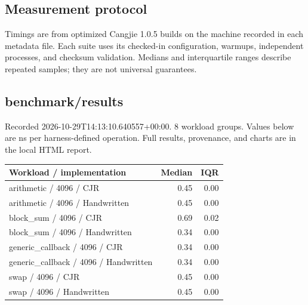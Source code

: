 \subsection{Measurement protocol}
Timings are from optimized Cangjie 1.0.5 builds on the machine recorded in each metadata file. Each suite uses its checked-in configuration, warmups, independent processes, and checksum validation. Medians and interquartile ranges describe repeated samples; they are not universal guarantees.\par
\subsection{benchmark/results}
Recorded 2026-10-29T14:13:10.640557+00:00. 8 workload groups. Values below are ns per harness-defined operation. Full results, provenance, and charts are in the local HTML report.
\begin{longtable}{p{}rr}Workload / implementation & Median & IQR \\ \hline
arithmetic / 4096 / CJR & 0.45 & 0.00 \\
arithmetic / 4096 / Handwritten & 0.45 & 0.00 \\
block\_sum / 4096 / CJR & 0.69 & 0.02 \\
block\_sum / 4096 / Handwritten & 0.34 & 0.00 \\
generic\_callback / 4096 / CJR & 0.34 & 0.00 \\
generic\_callback / 4096 / Handwritten & 0.34 & 0.00 \\
swap / 4096 / CJR & 0.45 & 0.00 \\
swap / 4096 / Handwritten & 0.45 & 0.00 \\
\end{longtable}
